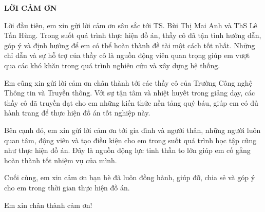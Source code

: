 \documentclass[../DoAn.tex]{subfiles}
\begin{document}
\begin{center}
    \Large{\textbf{LỜI CẢM ƠN}}\\
\end{center}
\vspace{1cm}
\noindent\hspace*{\parindent}Lời đầu tiên, em xin gửi lời cảm ơn sâu sắc tới TS. Bùi Thị Mai Anh và ThS Lê Tấn Hùng. Trong suốt quá trình thực hiện đồ án, thầy cô đã tận tình hướng dẫn, góp ý và định hướng để em có thể hoàn thành đề tài một cách tốt nhất. Những chỉ dẫn và sự hỗ trợ của thầy cô là nguồn động viên quan trọng giúp em vượt qua các khó khăn trong quá trình nghiên cứu và xây dựng hệ thống.

Em cũng xin gửi lời cảm ơn chân thành tới các thầy cô của Trường Công nghệ Thông tin và Truyền thông. Với sự tận tâm và nhiệt huyết trong giảng dạy, các thầy cô đã truyền đạt cho em những kiến thức nền tảng quý báu, giúp em có đủ hành trang để thực hiện đồ án tốt nghiệp này.

Bên cạnh đó, em xin gửi lời cảm ơn tới gia đình và người thân, những người luôn quan tâm, động viên và tạo điều kiện cho em trong suốt quá trình học tập cũng như thực hiện đồ án. Đây là nguồn động lực tinh thần to lớn giúp em cố gắng hoàn thành tốt nhiệm vụ của mình.

Cuối cùng, em xin cảm ơn bạn bè đã luôn đồng hành, giúp đỡ, chia sẻ và góp ý cho em trong thời gian thực hiện đồ án.

Em xin chân thành cảm ơn!
\end{document}
